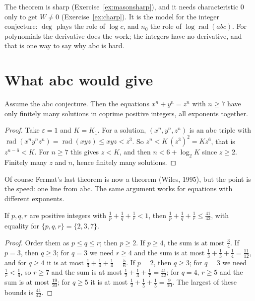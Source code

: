 The theorem is sharp (Exercise~\ref{ex:masonsharp}), and it needs characteristic $0$ only to get $W\ne0$ (Exercise~\ref{ex:charp}). It is the model for the
integer conjecture: $\deg$ plays the role of $\log c$, and $n_0$ the role of $\log\operatorname{rad}(abc)$. For polynomials the derivative does the work; the
integers have no derivative, and that is one way to say why abc is hard.

\section{What abc would give}

\begin{proposition}\label{prop:abcfermat}
Assume the abc conjecture. Then the equations $x^n+y^n=z^n$ with $n\ge7$ have only finitely many solutions in coprime positive integers, all exponents
together.
\end{proposition}
\begin{proof}
Take $\varepsilon=1$ and $K=K_1$. For a solution, $(x^n,y^n,z^n)$ is an abc triple with $\operatorname{rad}(x^ny^nz^n)=\operatorname{rad}(xyz)\le xyz<z^3$. So
$z^n<K\,(z^3)^2=Kz^6$, that is $z^{n-6}<K$. For $n\ge7$ this gives $z<K$, and then $n<6+\log_2K$ since $z\ge2$. Finitely many $z$ and $n$, hence
finitely many solutions.
\end{proof}

Of course Fermat's last theorem is now a theorem (Wiles, 1995), but the point is the speed: one line from abc. The same argument works for equations
with different exponents.

\begin{lemma}\label{lem:4142}
If $p,q,r$ are positive integers with $\frac1p+\frac1q+\frac1r<1$, then $\frac1p+\frac1q+\frac1r\le\frac{41}{42}$, with equality for $\{p,q,r\}=\{2,3,7\}$.
\end{lemma}
\begin{proof}
Order them as $p\le q\le r$; then $p\ge2$. If $p\ge4$, the sum is at most $\frac34$. If $p=3$, then $q\ge3$; for $q=3$ we need $r\ge4$ and the sum is at most
$\frac1{3}+\frac13+\frac14=\frac{11}{12}$, and for $q\ge4$ it is at most $\frac13+\frac14+\frac14=\frac56$. If $p=2$, then $q\ge3$; for $q=3$ we need
$\frac1r<\frac16$, so $r\ge7$ and the sum is at most $\frac12+\frac13+\frac17=\frac{41}{42}$; for $q=4$, $r\ge5$ and the sum is at most $\frac{19}{20}$; for
$q\ge5$ it is at most $\frac12+\frac15+\frac15=\frac9{10}$. The largest of these bounds is $\frac{41}{42}$.
\end{proof}

